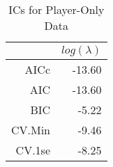 \begin{table}[ht]
\centering
\begin{tabular}{rr}
  \hline
 & $log(\lambda)$ \\ 
  \hline
AICc & -13.60 \\ 
  AIC & -13.60 \\ 
  BIC & -5.22 \\ 
  CV.Min & -9.46 \\ 
  CV.1se & -8.25 \\ 
   \hline
\end{tabular}
\caption{ICs for Player-Only Data} 
\label{tab:pl_ic}
\end{table}
